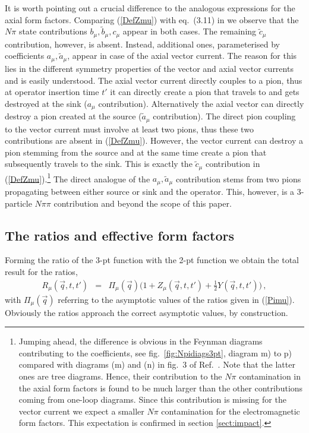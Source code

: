 \documentclass[11pt,prd,aps,showpacs,eqsecnum,floatfix,nofootinbib,preprint,tightenlines]{revtex4}
\newcommand{\pref}[1]{(\ref{#1})}
\begin{document}
It is worth pointing out a crucial difference to the analogous expressions for the axial form factors. Comparing \pref{DefZmu} with eq.\ (3.11) in \cite{Bar:2018xyi} we observe that the $N\pi$ state contributions $b_{\mu},\tilde{b}_{\mu}, c_{\mu}$ appear in both cases. The remaining $\tilde{c}_{\mu}$ contribution, however, is absent. Instead,  additional ones, parameterised by coefficients $a_{\mu}, \tilde{a}_{\mu}$, appear in case of the axial vector current. The reason for this lies in the different symmetry properties of the vector and axial vector currents and is easily understood. The axial vector current directly couples to a pion, thus at operator insertion time $t'$ it can directly create a pion that travels to and gets destroyed at the sink ($a_{\mu}$ contribution). Alternatively the axial vector can directly destroy a pion created at the source  ($\tilde{a}_{\mu}$ contribution). The direct pion coupling to the vector current must involve at least two pions, thus these two contributions are absent in \pref{DefZmu}. However, the vector current can destroy a pion stemming from the source and at the same time create a pion that subsequently travels to the sink. This is exactly the $\tilde{c}_{\mu}$ contribution in \pref{DefZmu}.\footnote{Jumping ahead, the difference is obvious in the Feynman diagrams contributing to the coefficients, see fig.\ \ref{fig:Npidiags3pt}, diagram m) to p) compared with diagrams (m) and (n) in fig.\ 3 of Ref.\ \cite{Bar:2018xyi}. Note that the latter ones are tree diagrams. Hence, their contribution to the $N\pi$ contamination in the axial form factors is found to be much larger than the other contributions coming from one-loop diagrams. Since this contribution is missing for the vector current we expect a smaller $N\pi$ contamination for the electromagnetic form factors. This expectation is confirmed in section \ref{sect:impact}.} The direct analogue of the $a_{\mu}, \tilde{a}_{\mu}$ contribution stems from two pions propagating between either source or sink and the operator. This, however, is a 3-particle $N\pi\pi$ contribution and beyond the scope of this paper.

\subsection{The ratios and effective form factors}

Forming the ratio of the 3-pt function with the 2-pt function we obtain the total result for the ratios,
\begin{eqnarray}
R_{\mu}(\vec{q},t,t')&=& \Pi_{\mu}(\vec{q}) \Bigg(1+ Z_{\mu}(\vec{q},t,t') + \frac{1}{2} Y(\vec{q},t,t')\Bigg)\,,\label{NpiConttot}
\end{eqnarray}
with $\Pi_{\mu}(\vec{q})$ referring to the asymptotic values of the ratios given in \pref{Pimu}. Obviously the ratios approach the correct asymptotic values, by construction. 
\end{document}
